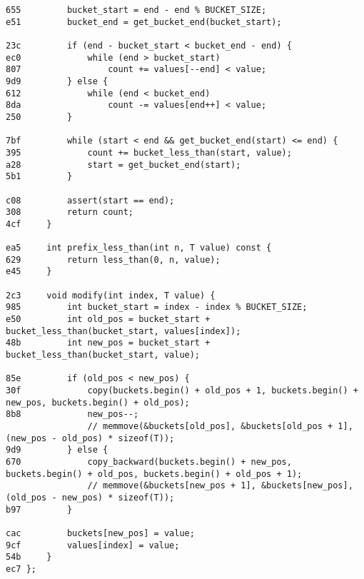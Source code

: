\documentclass[11pt, a4paper, twoside]{article}
\begin{document}
\begin{lstlisting}
655         bucket_start = end - end % BUCKET_SIZE;
e51         bucket_end = get_bucket_end(bucket_start);
    
23c         if (end - bucket_start < bucket_end - end) {
ec0             while (end > bucket_start)
807                 count += values[--end] < value;
9d9         } else {
612             while (end < bucket_end)
8da                 count -= values[end++] < value;
250         }
    
7bf         while (start < end && get_bucket_end(start) <= end) {
395             count += bucket_less_than(start, value);
a28             start = get_bucket_end(start);
5b1         }
    
c08         assert(start == end);
308         return count;
4cf     }
    
ea5     int prefix_less_than(int n, T value) const {
629         return less_than(0, n, value);
e45     }
    
2c3     void modify(int index, T value) {
985         int bucket_start = index - index % BUCKET_SIZE;
e50         int old_pos = bucket_start + bucket_less_than(bucket_start, values[index]);
48b         int new_pos = bucket_start + bucket_less_than(bucket_start, value);
    
85e         if (old_pos < new_pos) {
30f             copy(buckets.begin() + old_pos + 1, buckets.begin() + new_pos, buckets.begin() + old_pos);
8b8             new_pos--;
                // memmove(&buckets[old_pos], &buckets[old_pos + 1], (new_pos - old_pos) * sizeof(T));
9d9         } else {
670             copy_backward(buckets.begin() + new_pos, buckets.begin() + old_pos, buckets.begin() + old_pos + 1);
                // memmove(&buckets[new_pos + 1], &buckets[new_pos], (old_pos - new_pos) * sizeof(T));
b97         }
    
cac         buckets[new_pos] = value;
9cf         values[index] = value;
54b     }
ec7 };
\end{lstlisting}
\end{document}
